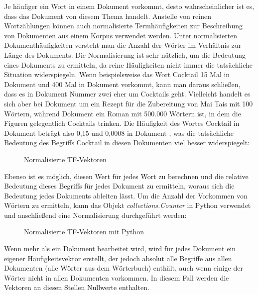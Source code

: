 Je häufiger ein Wort in einem Dokument vorkommt, desto wahrscheinlicher ist es, dass das Dokument von diesem Thema handelt. 
Anstelle von reinen Wortzählungen können auch normalisierte Termhäufigkeiten zur Beschreibung von Dokumenten aus einem Korpus verwendet werden. 
Unter normalisierten Dokumenthäufigkeiten versteht man die Anzahl der Wörter im Verhältnis zur Länge des Dokuments. 
Die Normalisierung ist sehr nützlich, um die Bedeutung eines Dokuments zu ermitteln, da reine Häufigkeiten nicht immer die tatsächliche Situation widerspiegeln. 
Wenn beispielsweise das Wort \glqq Cocktail\grqq{} 15 Mal in Dokument  und 400 Mal in Dokument  vorkommt, kann man daraus schließen, dass es in Dokument Nummer zwei eher um Cocktails geht.
Vielleicht handelt es sich aber bei Dokument  um ein Rezept für die Zubereitung von Mai Tais mit 100 Wörtern, während Dokument  ein Roman mit 500.000 Wörtern ist, in dem die Figuren gelegentlich Cocktails trinken. 
Die Häufigkeit des Wortes \glqq Cocktail\grqq{} in Dokument  beträgt also 0,15 und 0,0008 in Dokument , was die tatsächliche Bedeutung des Begriffs \glqq Cocktail\grqq{} in diesen Dokumenten viel besser widerspiegelt:
\begin{figure}[H]
    \centering
    \caption{\label{figure:Norm_Vektoren}Normalisierte \ac{TF}-Vektoren}
\end{figure}
\noindent
Ebenso ist es möglich, diesen Wert für jedes Wort zu berechnen und die relative Bedeutung dieses Begriffs für jedes Dokument zu ermitteln, woraus sich die Bedeutung jedes Dokuments ableiten lässt. 
Um die Anzahl der Vorkommen von Wörtern zu ermitteln, kann das Objekt \textit{collections.Counter} in Python verwendet und anschließend eine Normalisierung durchgeführt werden:
\begin{figure}[H]
    \centering
    \caption{\label{figure:Norm_Vektoren_Python}Normalisierte \ac{TF}-Vektoren mit Python}
\end{figure}
\noindent
Wenn mehr als ein Dokument bearbeitet wird, wird für jedes Dokument ein eigener Häufigkeitsvektor erstellt, der jedoch absolut alle Begriffe aus allen Dokumenten (alle Wörter aus dem Wörterbuch) enthält, auch wenn einige der Wörter nicht in allen Dokumenten vorkommen. 
In diesem Fall werden die Vektoren an diesen Stellen Nullwerte enthalten.\\\\
